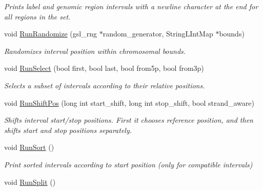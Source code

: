 \begin{DoxyCompactItemize}
\begin{DoxyCompactList}\small\item\em Prints label and genomic region intervals with a newline character at the end for all regions in the set. \end{DoxyCompactList}\item 
\hypertarget{classGenomicRegionSet_a1b2b9edad211ca961f319921d38bfbf6}{
void \hyperlink{classGenomicRegionSet_a1b2b9edad211ca961f319921d38bfbf6}{RunRandomize} (gsl\_\-rng $\ast$random\_\-generator, StringLIntMap $\ast$bounds)}
\label{classGenomicRegionSet_a1b2b9edad211ca961f319921d38bfbf6}

\begin{DoxyCompactList}\small\item\em Randomizes interval position within chromosomal bounds. \end{DoxyCompactList}\item 
\hypertarget{classGenomicRegionSet_a7b522944fe4f7f489c99fb76ce7f576c}{
void \hyperlink{classGenomicRegionSet_a7b522944fe4f7f489c99fb76ce7f576c}{RunSelect} (bool first, bool last, bool from5p, bool from3p)}
\label{classGenomicRegionSet_a7b522944fe4f7f489c99fb76ce7f576c}

\begin{DoxyCompactList}\small\item\em Selects a subset of intervals according to their relative positions. \end{DoxyCompactList}\item 
void \hyperlink{classGenomicRegionSet_a0c9ba06ad5aff586193ba765e6d13a27}{RunShiftPos} (long int start\_\-shift, long int stop\_\-shift, bool strand\_\-aware)
\begin{DoxyCompactList}\small\item\em Shifts interval start/stop positions. First it chooses reference position, and then shifts start and stop positions separately. \end{DoxyCompactList}\item 
\hypertarget{classGenomicRegionSet_a53143cb3271c65fb289faece622cd8bd}{
void \hyperlink{classGenomicRegionSet_a53143cb3271c65fb289faece622cd8bd}{RunSort} ()}
\label{classGenomicRegionSet_a53143cb3271c65fb289faece622cd8bd}

\begin{DoxyCompactList}\small\item\em Print sorted intervals according to start position (only for compatible intervals) \end{DoxyCompactList}\item 
\hypertarget{classGenomicRegionSet_a570e56362af1b30e7f5cb149ea42e54e}{
void \hyperlink{classGenomicRegionSet_a570e56362af1b30e7f5cb149ea42e54e}{RunSplit} ()}
\label{classGenomicRegionSet_a570e56362af1b30e7f5cb149ea42e54e}


\end{DoxyCompactItemize}

